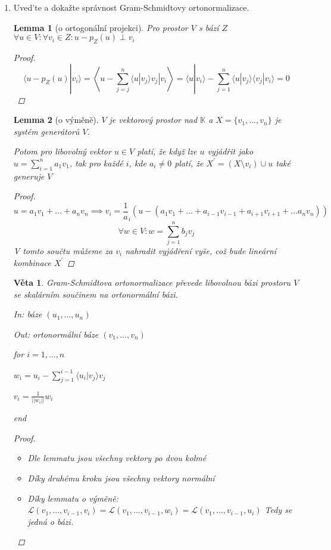 \documentclass[10pt,a4paper]{article}
\newtheorem{lemma}{Lemma}
\theoremstyle{plain}
\newtheorem{veta}{Věta}
\begin{document}
\begin{enumerate}
\item Uved'te a dokažte správnost Gram-Schmidtovy ortonormalizace.

\begin{lemma}[o ortogonální projekci] Pro prostor $V$ s bází $Z$ $ \forall u \in V: \forall v_i \in Z: u - p_Z(u) \perp v_i $
\begin{proof}
\[   \langle u - p_Z(u) | v_i \rangle =  \left\langle u - \sum_{j=j}^n  \langle u | v_j \rangle v_j | v_i \right\rangle = \langle u | v_i \rangle - \sum_{j=1}^n  \langle u | v_j \rangle \langle v_j | v_i \rangle = 0  \]
\end{proof}
\end{lemma}

\begin{lemma}[o výměně] $V$ je vektorový prostor nad $\mathbb{K}$ a $X = \{v_1, ..., v_n\}$ je systém generátorů $V$.

Potom pro libovolný vektor $u \in V$ platí, že když lze $u$ vyjádřit jako $u = \displaystyle \sum^n_{i=1} a_1v_1$, tak pro každé $i$, kde $a_i \neq 0$ platí, že $X^\prime = (X \setminus v_i) \cup u$ také generuje $V$

\begin{proof}
\begin{equation*}
u = a_1v_1 + ... + a_nv_n \implies v_i = \frac1a_i (u - (a_1v_1 + ... + a_{i-1}v_{i-1}+  a_{i+1}v_{i+1} + ...  a_{n}v_{n}))
\end{equation*}
\begin{equation*}
\forall w \in V: w = \sum_{j=1}^n b_j v_j
\end{equation*}
V tomto součtu můžeme za $v_i$ nahradit vyjádření vyše, což bude lineární kombinace $X^\prime$
\end{proof}
\end{lemma}

\begin{veta} Gram-Schmidtova ortonormalizace převede libovolnou bázi prostoru $V$ se skalárním součinem na ortonormální bázi. 

In: báze $(u_1, ..., u_n)$

Out: ortonormální báze $(v_1, ..., v_n)$

for $i = 1, ..., n$

$w_i = u_i - \sum^{i-1}_{j = 1} \langle u_i | v_j \rangle v_j$

$v_i = \frac1{||w_i||} w_i$

end
\begin{proof}
\begin{itemize}
\item Dle lemmatu jsou všechny vektory po dvou kolmé
\item Díky druhému kroku jsou všechny vektory normální
\item Díky lemmatu o výměně: $\mathcal{L}(v_1, ..., v_{i-1}, v_i) = \mathcal{L}(v_1, ..., v_{i-1}, w_i) =  \mathcal{L}(v_1, ..., v_{i-1}, u_i) $ Tedy se jedná o bázi.
\end{itemize}
\end{proof}
\end{veta}



\end{enumerate}
\end{document}
